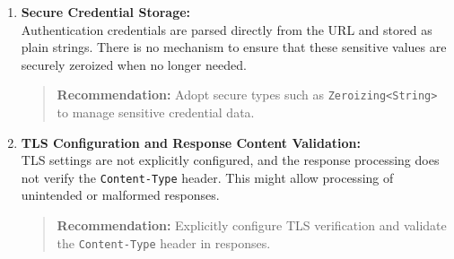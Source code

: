 \documentclass[12pt,a4paper]{article}
\begin{document}
\begin{enumerate}


    \item \textbf{Secure Credential Storage:}\\
    Authentication credentials are parsed directly from the URL and stored as plain strings. There is no mechanism to ensure that these sensitive values are securely zeroized when no longer needed.
    \begin{quote}
    \textbf{Recommendation:} Adopt secure types such as \texttt{Zeroizing<String>} to manage sensitive credential data.
    \end{quote}

    \item \textbf{TLS Configuration and Response Content Validation:}\\
    TLS settings are not explicitly configured, and the response processing does not verify the \texttt{Content-Type} header. This might allow processing of unintended or malformed responses.
    \begin{quote}
    \textbf{Recommendation:} Explicitly configure TLS verification and validate the \texttt{Content-Type} header in responses.
    \end{quote}



\end{enumerate}
\end{document}
